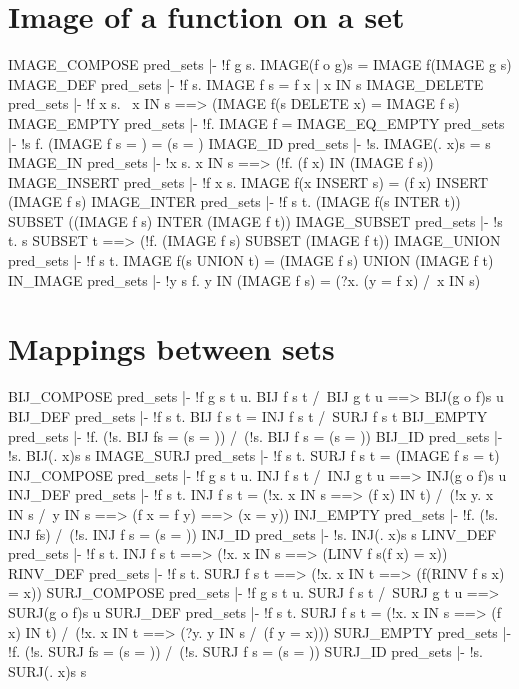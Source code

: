 \section{Image of a function on a set}
\THEOREM IMAGE\_COMPOSE pred\_sets
|- !f g s. IMAGE(f o g)s = IMAGE f(IMAGE g s)
\ENDTHEOREM
\THEOREM IMAGE\_DEF pred\_sets
|- !f s. IMAGE f s = {f x | x IN s}
\ENDTHEOREM
\THEOREM IMAGE\_DELETE pred\_sets
|- !f x s. ~x IN s ==> (IMAGE f(s DELETE x) = IMAGE f s)
\ENDTHEOREM
\THEOREM IMAGE\_EMPTY pred\_sets
|- !f. IMAGE f{} = {}
\ENDTHEOREM
\THEOREM IMAGE\_EQ\_EMPTY pred\_sets
|- !s f. (IMAGE f s = {}) = (s = {})
\ENDTHEOREM
\THEOREM IMAGE\_ID pred\_sets
|- !s. IMAGE(\x. x)s = s
\ENDTHEOREM
\THEOREM IMAGE\_IN pred\_sets
|- !x s. x IN s ==> (!f. (f x) IN (IMAGE f s))
\ENDTHEOREM
\THEOREM IMAGE\_INSERT pred\_sets
|- !f x s. IMAGE f(x INSERT s) = (f x) INSERT (IMAGE f s)
\ENDTHEOREM
\THEOREM IMAGE\_INTER pred\_sets
|- !f s t. (IMAGE f(s INTER t)) SUBSET ((IMAGE f s) INTER (IMAGE f t))
\ENDTHEOREM
\THEOREM IMAGE\_SUBSET pred\_sets
|- !s t. s SUBSET t ==> (!f. (IMAGE f s) SUBSET (IMAGE f t))
\ENDTHEOREM
\THEOREM IMAGE\_UNION pred\_sets
|- !f s t. IMAGE f(s UNION t) = (IMAGE f s) UNION (IMAGE f t)
\ENDTHEOREM
\THEOREM IN\_IMAGE pred\_sets
|- !y s f. y IN (IMAGE f s) = (?x. (y = f x) /\ x IN s)
\ENDTHEOREM
\section{Mappings between sets}
\THEOREM BIJ\_COMPOSE pred\_sets
|- !f g s t u. BIJ f s t /\ BIJ g t u ==> BIJ(g o f)s u
\ENDTHEOREM
\THEOREM BIJ\_DEF pred\_sets
|- !f s t. BIJ f s t = INJ f s t /\ SURJ f s t
\ENDTHEOREM
\THEOREM BIJ\_EMPTY pred\_sets
|- !f. (!s. BIJ f{}s = (s = {})) /\ (!s. BIJ f s{} = (s = {}))
\ENDTHEOREM
\THEOREM BIJ\_ID pred\_sets
|- !s. BIJ(\x. x)s s
\ENDTHEOREM
\THEOREM IMAGE\_SURJ pred\_sets
|- !f s t. SURJ f s t = (IMAGE f s = t)
\ENDTHEOREM
\THEOREM INJ\_COMPOSE pred\_sets
|- !f g s t u. INJ f s t /\ INJ g t u ==> INJ(g o f)s u
\ENDTHEOREM
\THEOREM INJ\_DEF pred\_sets
|- !f s t.
    INJ f s t =
    (!x. x IN s ==> (f x) IN t) /\
    (!x y. x IN s /\ y IN s ==> (f x = f y) ==> (x = y))
\ENDTHEOREM
\THEOREM INJ\_EMPTY pred\_sets
|- !f. (!s. INJ f{}s) /\ (!s. INJ f s{} = (s = {}))
\ENDTHEOREM
\THEOREM INJ\_ID pred\_sets
|- !s. INJ(\x. x)s s
\ENDTHEOREM
\THEOREM LINV\_DEF pred\_sets
|- !f s t. INJ f s t ==> (!x. x IN s ==> (LINV f s(f x) = x))
\ENDTHEOREM
\THEOREM RINV\_DEF pred\_sets
|- !f s t. SURJ f s t ==> (!x. x IN t ==> (f(RINV f s x) = x))
\ENDTHEOREM
\THEOREM SURJ\_COMPOSE pred\_sets
|- !f g s t u. SURJ f s t /\ SURJ g t u ==> SURJ(g o f)s u
\ENDTHEOREM
\THEOREM SURJ\_DEF pred\_sets
|- !f s t.
    SURJ f s t =
    (!x. x IN s ==> (f x) IN t) /\
    (!x. x IN t ==> (?y. y IN s /\ (f y = x)))
\ENDTHEOREM
\THEOREM SURJ\_EMPTY pred\_sets
|- !f. (!s. SURJ f{}s = (s = {})) /\ (!s. SURJ f s{} = (s = {}))
\ENDTHEOREM
\THEOREM SURJ\_ID pred\_sets
|- !s. SURJ(\x. x)s s
\ENDTHEOREM
